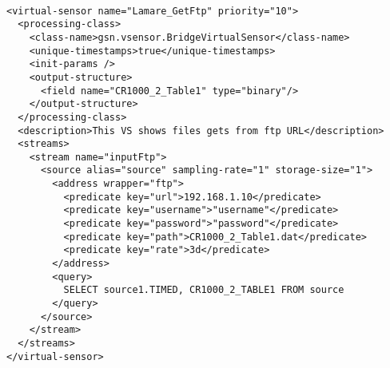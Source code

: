 \paragraph{}
\begin{lstlisting}
<virtual-sensor name="Lamare_GetFtp" priority="10">
  <processing-class>
    <class-name>gsn.vsensor.BridgeVirtualSensor</class-name>
    <unique-timestamps>true</unique-timestamps>
    <init-params />
    <output-structure>
      <field name="CR1000_2_Table1" type="binary"/>
    </output-structure>
  </processing-class>
  <description>This VS shows files gets from ftp URL</description>
  <streams>
    <stream name="inputFtp">
      <source alias="source" sampling-rate="1" storage-size="1">
        <address wrapper="ftp">
          <predicate key="url">192.168.1.10</predicate>
          <predicate key="username">"username"</predicate>
          <predicate key="password">"password"</predicate>
          <predicate key="path">CR1000_2_Table1.dat</predicate>
          <predicate key="rate">3d</predicate>
        </address>
        <query>
          SELECT source1.TIMED, CR1000_2_TABLE1 FROM source
        </query>
      </source>
    </stream>
  </streams>
</virtual-sensor>
\end{lstlisting}